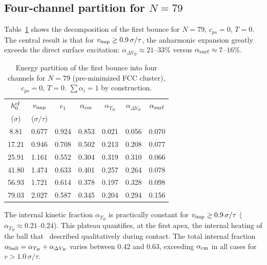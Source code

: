 \documentclass[aps,pre,twocolumn,reprint,superscriptaddress]{revtex4-2}
\begin{document}
\subsection{Four-channel partition for \texorpdfstring{$N=79$}{N=79}}
\label{sec:4canales}

Table~\ref{tab:particion4} shows the decomposition of the first bounce for
$N=79$, $c_{ps}=0$, $T=0$. The central result is that for
$v_{\rm imp}\geq0.9\,\sigma/\tau$, the anharmonic expansion greatly exceeds
the direct surface excitation: $\alpha_{\Delta V_B}\approx21$--$33\%$
versus $\alpha_{\rm surf}\approx7$--$16\%$.

\begin{table}[tp]
\centering
\small
\caption{Energy partition of the first bounce into four channels for
$N=79$ (pre-minimized FCC cluster), $c_{ps}=0$, $T=0$.
$\sum\alpha_i=1$ by construction.}
\label{tab:particion4}
\begin{tabular}{ccccccc}
\toprule
$h_0^{\rm ef}$ & $v_{\rm imp}$ & $e_1$ &
$\alpha_{\rm cm}$ & $\alpha_{T_B}$ & $\alpha_{\Delta V_B}$ &
$\alpha_{\rm surf}$ \\
($\sigma$) & ($\sigma/\tau$) & & & & & \\
\midrule
 8.81 & 0.677 & 0.924 & 0.853 & 0.021 & 0.056 & 0.070 \\
17.21 & 0.946 & 0.708 & 0.502 & 0.213 & 0.208 & 0.077 \\
25.91 & 1.161 & 0.552 & 0.304 & 0.319 & 0.310 & 0.066 \\
41.80 & 1.474 & 0.633 & 0.401 & 0.257 & 0.264 & 0.078 \\
56.93 & 1.721 & 0.614 & 0.378 & 0.197 & 0.328 & 0.098 \\
79.03 & 2.027 & 0.587 & 0.345 & 0.204 & 0.294 & 0.156 \\
\bottomrule
\end{tabular}
\end{table}

The internal kinetic fraction $\alpha_{T_B}$ is practically constant for
$v_{\rm imp}\geq0.9\,\sigma/\tau$ ($\alpha_{T_B}\approx0.21$--$0.24$).
This plateau quantifies, at the first apex, the internal heating of the
ball that~\cite{Gutierrez2012} described qualitatively during contact.
The total internal fraction
$\alpha_{\rm ball}=\alpha_{T_B}+\alpha_{\Delta V_B}$ varies between 0.42
and 0.63, exceeding $\alpha_{\rm cm}$ in all cases for
$v>1.0\,\sigma/\tau$.
\end{document}
